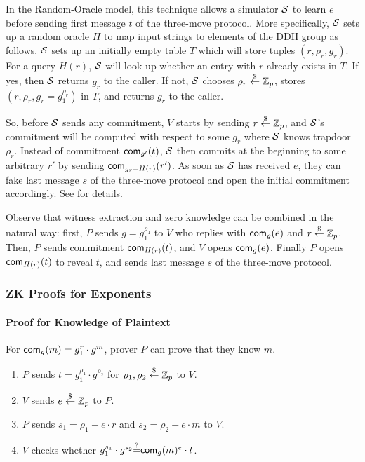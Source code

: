 In the Random-Oracle model, this technique allows a simulator ${\mathcal{S}}$
to learn $e$ before sending first message $t$ of the three-move
protocol.  More specifically, ${\mathcal{S}}$ sets up a random oracle $H$ to
map input strings to elements of the DDH group as follows. ${\mathcal{S}}$ sets
up an initially empty table $T$ which will store tuples
$(r,\rho_r,g_r)$. For a query $H(r)$, ${\mathcal{S}}$ will look up whether an
entry with $r$ already exists in $T$. If yes, then ${\mathcal{S}}$ returns
$g_r$ to the caller. If not, ${\mathcal{S}}$ chooses $\rho_r\stackrel{\$}{\leftarrow}\mathbb{Z}_p$, stores
$(r,\rho_r,g_r=g_1^{\rho_r})$ in $T$, and returns $g_r$ to the caller.

So, before ${\mathcal{S}}$ sends any commitment, $V$ starts by sending
$r\stackrel{\$}{\leftarrow}\mathbb{Z}_p$, and ${\mathcal{S}}$'s commitment will be computed with respect to
some $g_r$ where ${\mathcal{S}}$ knows trapdoor $\rho_r$.  Instead of
commitment $\mathsf{com}_{g'}(t)$, ${\mathcal{S}}$ then commits at the beginning to
some arbitrary $r'$ by sending $\mathsf{com}_{g_r=H(r)}(r')$. As soon as
${\mathcal{S}}$ has received $e$, they can fake last message $s$ of the
three-move protocol and open the initial commitment accordingly.  See
\citet{crs} for details.

Observe that witness extraction and zero knowledge can be combined in
the natural way: first, $P$ sends $g=g_1^{\rho_1}$ to $V$ who replies
with $\mathsf{com}_g(e)$ and $r\stackrel{\$}{\leftarrow}\mathbb{Z}_p$. Then, $P$ sends commitment
$\mathsf{com}_{H(r)}(t)$, and $V$ opens $\mathsf{com}_g(e)$.  Finally $P$ opens
$\mathsf{com}_{H(r)}(t)$ to reveal $t$, and sends last message $s$ of the
three-move protocol.

\subsubsection{ZK Proofs for Exponents}
\paragraph{Proof for Knowledge of Plaintext}
For $\mathsf{com}_{g}(m)=g_1^r\cdot{}g^m$,  prover $P$ can prove that they know
$m$.

\begin{enumerate}
\item $P$ sends $t=g_1^{\rho_1}\cdot{}g^{\rho_2}$ for
  $\rho_1,\rho_2\stackrel{\$}{\leftarrow}\mathbb{Z}_p$ to $V$.
\item $V$ sends $e\stackrel{\$}{\leftarrow}\mathbb{Z}_p$ to $P$.
  \item $P$ sends $s_1=\rho_1+e\cdot{}r$ and $s_2=\rho_2+e\cdot{}m$ to
    $V$.
    \item $V$ checks whether $g_1^{s_1}\cdot{}g^{s_2}{\stackrel{?}{=}}\mathsf{com}_{g}(m)^e\cdot{}t$.
\end{enumerate}


